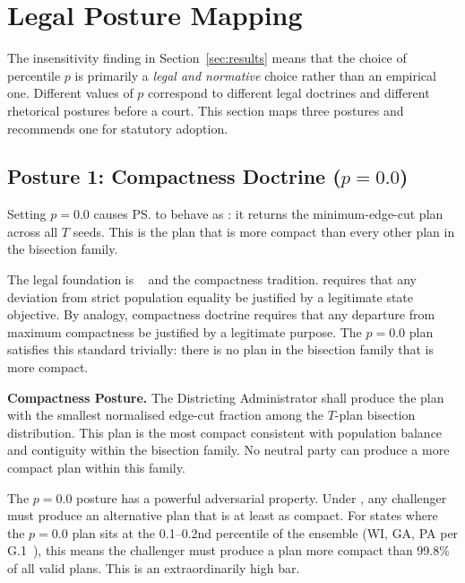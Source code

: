 \section{Legal Posture Mapping}
\label{sec:legal-posture}

The insensitivity finding in Section~\ref{sec:results} means that the choice
of percentile $p$ is primarily a \emph{legal and normative} choice rather
than an empirical one.
Different values of $p$ correspond to different legal doctrines and different
rhetorical postures before a court.
This section maps three postures and recommends one for statutory adoption.

\subsection{Posture 1: Compactness Doctrine ($p = 0.0$)}

Setting $p = 0.0$ causes \ps{} to behave as \cs{}: it returns the
minimum-edge-cut plan across all $T$ seeds.
This is the plan that is more compact than every other plan in the bisection
family.

The legal foundation is \karcher{}~\citep{karcher1983} and the compactness
tradition.
\karcher{} requires that any deviation from strict population equality be
justified by a legitimate state objective.
By analogy, compactness doctrine requires that any departure from maximum
compactness be justified by a legitimate purpose.
The $p = 0.0$ plan satisfies this standard trivially: there is no plan in
the bisection family that is more compact.

\begin{statute}
\textbf{Compactness Posture.}
The Districting Administrator shall produce the plan with the smallest
normalised edge-cut fraction among the $T$-plan bisection distribution.
This plan is the most compact consistent with population balance and
contiguity within the \ar{} bisection family.
No neutral party can produce a more compact plan within this family.
\end{statute}

The $p = 0.0$ posture has a powerful adversarial property.
Under \karcher{}, any challenger must produce an alternative plan that
is at least as compact.
For states where the $p = 0.0$ plan sits at the 0.1--0.2nd percentile
of the \recom{} ensemble (WI, GA, PA per G.1~\citep{g1paper}), this means
the challenger must produce a plan more compact than 99.8\% of all valid
plans.
This is an extraordinarily high bar.


